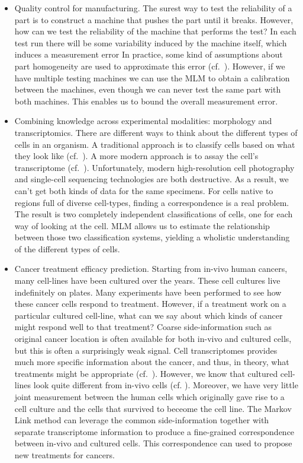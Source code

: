 \begin{itemize}
    \item Quality control for manufacturing.   The surest way to test the reliability of a part is to construct a machine that pushes the part until it breaks.  However, how can we test the reliability of the machine that performs the test?  In each test run there will be some variability induced by the machine itself, which induces a measurement error  In practice, some kind of assumptions about part homogeneity are used to approximate this error (cf.\ \cite{de2005gauge}).  However, if we have multiple testing machines we can use the MLM to obtain a calibration between the machines, even though we can never test the same part with both machines.  This enables us to bound the overall measurement error.  

    \item Combining knowledge across experimental modalities: morphology and transcriptomics.  There are different ways to think about the different types of cells in an organism.  A traditional approach is to classify cells based on what they look like (cf.\ \cite{steinman1973identification,bloomfield1982physiological}).  A more modern approach is to assay the cell's transcriptome (cf.\ \citep{tasic2017shared}).  Unfortunately, modern high-resolution cell photography and single-cell sequencing technologies are both destructive.  As a result, we can't get both kinds of data for the same specimens.  For cells native to regions full of diverse cell-types, finding a correspondence is a real problem.  The result is two completely independent classifications of cells, one for each way of looking at the cell.  MLM allows us to estimate the relationship between those two classification systems, yielding a wholistic understanding of the different types of cells.  

    \item Cancer treatment efficacy prediction.  Starting from in-vivo human cancers, many cell-lines have been cultured over the years.  These cell cultures live indefinitely on plates.  Many experiments have been performed to see how these cancer cells respond to treatment.  However, if a treatment work on a particular cultured cell-line, what can we say about which kinds of cancer might respond well to that treatment?  Coarse side-information such as original cancer location is often available for both in-vivo and cultured cells, but this is often a surprisingly weak signal.  Cell transcriptomes provides much more specific information about the cancer, and thus, in theory, what treatments might be appropriate (cf.\ \cite{cieslik2018cancer}).  However, we know that cultured cell-lines look quite different from in-vivo cells (cf. \cite{imamura2015comparison,haibe2013inconsistency}).  Moreover, we have very little joint measurement between the human cells which originally gave rise to a cell culture and the cells that survived to beceome the cell line.  The Markov Link method can leverage the common side-information together with separate transcriptome information to produce a fine-grained correspondence between in-vivo and cultured cells.  This correspondence can used to propose new treatments for cancers.


\end{itemize}
